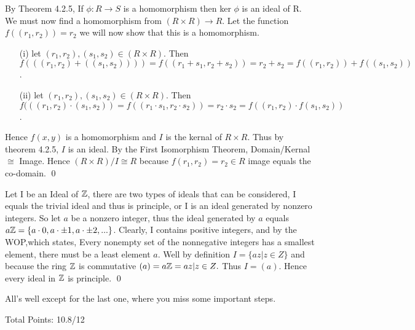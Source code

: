 \documentclass[11pt]{article}
\begin{document}

\proof
{By Theorem 4.2.5, If \(\phi : R \rightarrow S\) is a homomorphism then ker \(\phi\) is an ideal of R. We must now find a homomorphism from \((R \times R) \rightarrow R\). Let the function \(f((r_1,r_2)) = r_2\) we will now show that this is a homomorphism.
\begin{itemize}
    \item[(i)] let \((r_1,r_2), (s_1,s_2) \in (R \times R)\). Then \(f(((r_1,r_2) + ((s_1,s_2)))) = f((r_1 + s_1,r_2 + s_2)) = r_2+s_2 = f((r_1,r_2))+f((s_1,s_2))\).
    \item[(ii)] let \((r_1,r_2), (s_1,s_2) \in (R \times R)\). Then \(f(((r_1,r_2)\cdot (s_1,s_2))= f((r_1 \cdot s_1,r_2 \cdot s_2)) = r_2 \cdot s_2 = f((r_1,r_2) \cdot f(s_1,s_2))\).
\end{itemize}}
Hence \(f(x,y)\) is a homomorphism and \(I\) is the kernal of \(R \times R\). Thus by theorem 4.2.5, \(I\) is an ideal. By the First Isomorphism Theorem, Domain/Kernal \(\cong\) Image. Hence \((R \times R)/I \cong R\) because \(f(r_1,r_2) = r_2 \in R\) image equals the co-domain.
\qed


\proof
{Let I be an Ideal of \({\mathbb{Z}}\), there are two types of ideals that can be considered, I equals the trivial ideal and thus is principle, or I is an ideal generated by nonzero integers. So let \(a\) be a nonzero integer, thus the ideal generated by \(a\) equals \(a{\mathbb{Z}} = \{a\cdot 0, a\cdot \pm 1, a\cdot \pm 2,...\}\). Clearly, I contains positive integers, and by the WOP,which states, Every nonempty set of the nonnegative integers has a smallest element, there must be a least element \(a\). Well by definition \(I = \{az | z \in Z\}\) and because the ring \({\mathbb{Z}}\) is commutative \((a)  = a{\mathbb{Z}} = {az|z\in Z}.\) Thus \(I = (a).\) Hence every ideal in \({\mathbb{Z}}\) is principle.}
\qed

\begin{solution}
All's well except for the last one, where you miss some important steps.

Total Points:  10.8/12
\end{solution}
\end{document}
